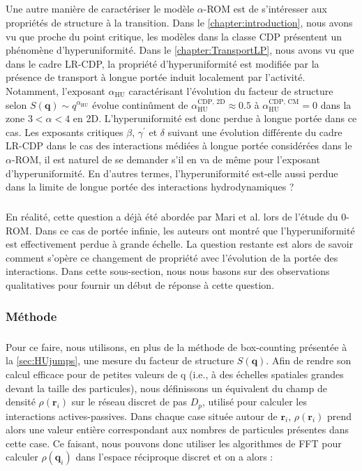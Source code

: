 \subparagraph{}Une autre manière de caractériser le modèle $\alpha$-ROM est de s'intéresser aux propriétés de structure à la transition. Dans le \autoref{chapter:introduction}, nous avons vu que proche du point critique, les modèles dans la classe CDP présentent un phénomène d'hyperuniformité. Dans le \autoref{chapter:TransportLP}, nous avons vu que dans le cadre LR-CDP, la propriété d'hyperuniformité est modifiée par la présence de transport à longue portée induit localement par l'activité. Notamment, l'exposant $\alpha_\text{HU}$ caractérisant l'évolution du facteur de structure selon $S(\mathbf{q})\sim q^{\alpha_\text{HU}}$ évolue continûment de $\alpha_\text{HU}^\text{CDP, 2D}\approx 0.5$ à $\alpha_\text{HU}^\text{CDP, CM} = 0$ dans la zone $3<\alpha<4$ en 2D. L'hyperuniformité est donc perdue à longue portée dans ce cas. Les exposants critiques $\beta$, $\gamma^\prime$ et $\delta$ suivant une évolution différente du cadre LR-CDP dans le cas des interactions médiées à longue portée considérées dans le $\alpha$-ROM, il est naturel de se demander s'il en va de même pour l'exposant d'hyperuniformité. En d'autres termes, l'hyperuniformité est-elle aussi perdue dans la limite de longue portée des interactions hydrodynamiques ? 

\subparagraph{}En réalité, cette question a déjà été abordée par Mari et al. \cite{mari_absorbing_2022} lors de l'étude du 0-ROM. Dans ce cas de portée infinie, les auteurs ont montré que l'hyperuniformité est effectivement perdue à grande échelle. La question restante est alors de savoir comment s'opère ce changement de propriété avec l'évolution de la portée des interactions. Dans cette sous-section, nous nous basons sur des observations qualitatives pour fournir un début de réponse à cette question.

\subsubsection{Méthode}

\subparagraph{}Pour ce faire, nous utilisons, en plus de la méthode de box-counting présentée à la \autoref{sec:HUjumps}, une mesure du facteur de structure $S(\mathbf{q})$. Afin de rendre son calcul efficace pour de petites valeurs de q (i.e., à des échelles spatiales grandes devant la taille des particules), nous définissons un équivalent du champ de densité $\rho(\mathbf{r}_i)$ sur le réseau discret de pas $D_p$, utilisé pour calculer les interactions actives-passives. Dans chaque case située autour de $\mathbf{r}_i$, $\rho(\mathbf{r}_i)$ prend alors une valeur entière correspondant aux nombres de particules présentes dans cette case. Ce faisant, nous pouvons donc utiliser les algorithmes de FFT pour calculer $\hat{\rho}(\mathbf{q}_i)$ dans l'espace réciproque discret et on a alors :

